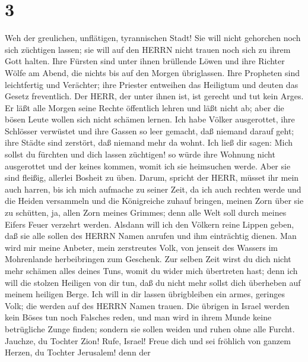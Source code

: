 \hypertarget{section-2}{%
\section{3}\label{section-2}}

 Weh der greulichen, unflätigen, tyrannischen Stadt!
 Sie will nicht gehorchen noch sich züchtigen lassen; sie
will auf den HERRN nicht trauen noch sich zu ihrem Gott halten.
 Ihre Fürsten sind unter ihnen brüllende Löwen und ihre
Richter Wölfe am Abend, die nichts bis auf den Morgen übriglassen.
 Ihre Propheten sind leichtfertig und Verächter; ihre
Priester entweihen das Heiligtum und deuten das Gesetz freventlich.
 Der HERR, der unter ihnen ist, ist gerecht und tut kein
Arges. Er läßt alle Morgen seine Rechte öffentlich lehren und läßt nicht
ab; aber die bösen Leute wollen sich nicht schämen lernen. 
Ich habe Völker ausgerottet, ihre Schlösser verwüstet und ihre Gassen so
leer gemacht, daß niemand darauf geht; ihre Städte sind zerstört, daß
niemand mehr da wohnt.  Ich ließ dir sagen: Mich sollst du
fürchten und dich lassen züchtigen! so würde ihre Wohnung nicht
ausgerottet und der keines kommen, womit ich sie heimsuchen werde. Aber
sie sind fleißig, allerlei Bosheit zu üben.  Darum, spricht
der HERR, müsset ihr mein auch harren, bis ich mich aufmache zu seiner
Zeit, da ich auch rechten werde und die Heiden versammeln und die
Königreiche zuhauf bringen, meinen Zorn über sie zu schütten, ja, allen
Zorn meines Grimmes; denn alle Welt soll durch meines Eifers Feuer
verzehrt werden.  Alsdann will ich den Völkern reine Lippen
geben, daß sie alle sollen des HERRN Namen anrufen und ihm einträchtig
dienen.  Man wird mir meine Anbeter, mein zerstreutes Volk,
von jenseit des Wassers im Mohrenlande herbeibringen zum Geschenk.
 Zur selben Zeit wirst du dich nicht mehr schämen alles
deines Tuns, womit du wider mich übertreten hast; denn ich will die
stolzen Heiligen von dir tun, daß du nicht mehr sollst dich überheben
auf meinem heiligen Berge.  Ich will in dir lassen
übrigbleiben ein armes, geringes Volk; die werden auf des HERRN Namen
trauen.  Die übrigen in Israel werden kein Böses tun noch
Falsches reden, und man wird in ihrem Munde keine betrügliche Zunge
finden; sondern sie sollen weiden und ruhen ohne alle Furcht.
 Jauchze, du Tochter Zion! Rufe, Israel! Freue dich und sei
fröhlich von ganzem Herzen, du Tochter Jerusalem!  denn der
